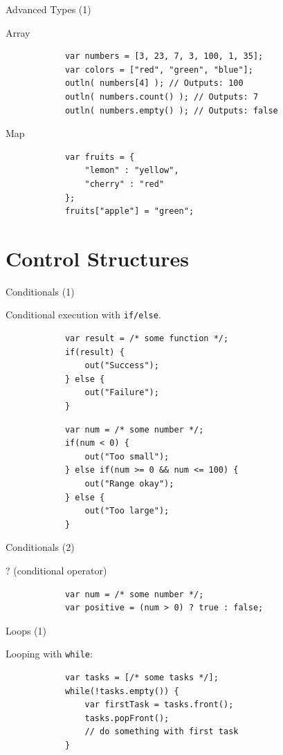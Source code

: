 \documentclass[ucs,9pt]{beamer}
\begin{document}
\begin{frame}[fragile]{Advanced Types (1)}
	\begin{block}{Array}
		\begin{lstlisting}
			var numbers = [3, 23, 7, 3, 100, 1, 35];
			var colors = ["red", "green", "blue"];
			outln( numbers[4] ); // Outputs: 100
			outln( numbers.count() ); // Outputs: 7
			outln( numbers.empty() ); // Outputs: false
		\end{lstlisting}
	\end{block}
	\begin{block}{Map}
		\begin{lstlisting}
			var fruits = {
			    "lemon" : "yellow",
			    "cherry" : "red"
			};
			fruits["apple"] = "green";
		\end{lstlisting}
	\end{block}
\end{frame}

\section{Control Structures}
\begin{frame}[fragile]{Conditionals (1)}
	\begin{block}{Conditional execution with \lstinline!if/else!.}
		\begin{lstlisting}
			var result = /* some function */;
			if(result) {
			    out("Success");
			} else {
			    out("Failure");
			}
		\end{lstlisting}
		\begin{lstlisting}
			var num = /* some number */;
			if(num < 0) {
			    out("Too small");
			} else if(num >= 0 && num <= 100) {
			    out("Range okay");
			} else {
			    out("Too large");
			}
		\end{lstlisting}
	\end{block}
\end{frame}

\begin{frame}[fragile]{Conditionals (2)}
	\begin{block}{? (conditional operator)}
		\begin{lstlisting}
			var num = /* some number */;
			var positive = (num > 0) ? true : false;
		\end{lstlisting}
	\end{block}
	\pause
	\vfill
\end{frame}

\begin{frame}[fragile]{Loops (1)}
	\begin{block}{Looping with \lstinline!while!:}
		\begin{lstlisting}
			var tasks = [/* some tasks */];
			while(!tasks.empty()) {
			    var firstTask = tasks.front();
			    tasks.popFront();
			    // do something with first task
			}
		\end{lstlisting}
	\end{block}
\end{frame}
\end{document}

